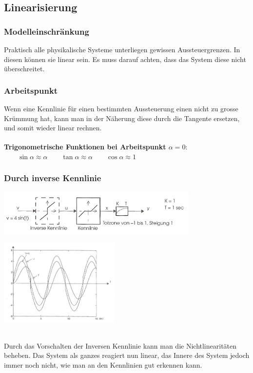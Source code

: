 	 
	
	\subsection{Linearisierung}
		\subsubsection{Modelleinschränkung }
			Praktisch alle physikalische Systeme unterliegen gewissen Aussteuergrenzen.
			In diesen können sie linear sein. Es muss darauf achten, dass  das System
			diese nicht überschreitet.
			
		\subsubsection{Arbeitspunkt }
			Wenn eine Kennlinie für einen bestimmten Aussteuerung einen nicht zu grosse
			Krümmung hat, kann man in der Näherung diese durch die Tangente ersetzen, und
			somit wieder linear rechnen. \\ \\
			\textbf{Trigonometrische Funktionen bei Arbeitspunkt $\alpha = 0$}: $\qquad \sin \alpha \approx
			\alpha \qquad \tan \alpha \approx \alpha \qquad \cos \alpha \approx 1$
		\subsubsection{Durch inverse Kennlinie }
		\begin{minipage}{11cm}
			\includegraphics[width=10cm]{./bilder/Kennlinienkompensation.jpg}
        \end{minipage}
		\begin{minipage}{6cm}
        	\includegraphics[width=6cm]{./bilder/Kennlinienkompensation_dia.jpg}
        \end{minipage}\\
			Durch das Vorschalten der Inversen Kennlinie kann man die Nichtlinearitäten
			beheben. Das System als ganzes reagiert nun linear, das Innere des System
			jedoch immer noch nicht, wie man an den Kennlinien gut erkennen kann.
			
